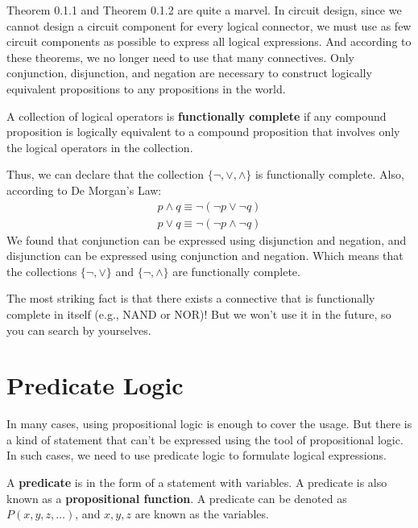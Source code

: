 \documentclass[oneside]{book}
\begin{document}
Theorem 0.1.1 and Theorem 0.1.2 are quite a marvel. In circuit design, since we cannot design a circuit component for every logical connector, we must use as few circuit components as possible to express all logical expressions. And according to these theorems, we no longer need to use that many connectives. Only conjunction, disjunction, and negation are necessary to construct logically equivalent propositions to any propositions in the world.

\begin{definition}
A collection of logical operators is \textbf{functionally complete} if any compound proposition is logically equivalent to a compound proposition that involves only the logical operators in the collection.
\end{definition}

Thus, we can declare that the collection $\{\neg, \vee, \wedge\}$ is functionally complete. Also, according to De Morgan’s Law:
\begin{align*}
    p \wedge q \equiv \neg(\neg p \vee \neg q) \\
    p \vee q \equiv \neg(\neg p \wedge \neg q)
\end{align*}
We found that conjunction can be expressed using disjunction and negation, and disjunction can be expressed using conjunction and negation. Which means that the collections $\{\neg, \vee\}$ and $\{\neg, \wedge\}$ are functionally complete.

\begin{remark}
The most striking fact is that there exists a connective that is functionally complete in itself (e.g., NAND or NOR)! But we won’t use it in the future, so you can search by yourselves.
\end{remark}

\section{Predicate Logic}
In many cases, using propositional logic is enough to cover the usage. But there is a kind of statement that can’t be expressed using the tool of propositional logic. In such cases, we need to use predicate logic to formulate logical expressions.

\begin{definition}[Predicate]
A \textbf{predicate} is in the form of a statement with variables. A predicate is also known as a \textbf{propositional function}. A predicate can be denoted as $P(x, y, z, \dots)$, and $x, y, z$ are known as the variables.
\end{definition}
\end{document}
